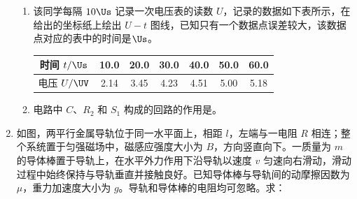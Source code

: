 \documentclass[\gkver]{gaokaozhenti}
\begin{document}
\begin{enumerate}
\begin{enumerate}
	\item
	该同学每隔 $10\Us$ 记录一次电压表的读数 $U$，记录的数据如下表所示，在给出的坐标纸上绘出 $U-t$ 图线，已知只有一个数据点误差较大，该数据点对应的表中的时间是$\Us$。

\begin{center}
\begin{tabular}{|c|c|c|c|c|c|c|}
\hline
时间 $t/\Us$ & 10.0 & 20.0 & 30.0 & 40.0 & 50.0 & 60.0 \\
\hline
电压 $U/\UV$ & 2.14 & 3.45 & 4.23 & 4.51 & 5.00 & 5.18 \\
\hline
\end{tabular}
\end{center}


	\item
	电路中 $C$、$R_2$ 和 $S_1$ 构成的回路的作用是。
\end{enumerate}


\item
如图，两平行金属导轨位于同一水平面上，相距 $l$，左端与一电阻 $R$ 相连；整个系统置于匀强磁场中，磁感应强度大小为 $B$，方向竖直向下。一质量为 $m$ 的导体棒置于导轨上，在水平外力作用下沿导轨以速度 $v$ 匀速向右滑动，滑动过程中始终保持与导轨垂直并接触良好。已知导体棒与导轨间的动摩擦因数为 $\mu$，重力加速度大小为 $g$。导轨和导体棒的电阻均可忽略。求：


\end{enumerate}
\end{document}

